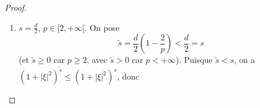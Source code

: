 \documentclass[]{report}
\begin{document}
\begin{proof}
\begin{enumerate}
            Donc
            \[\norme{u_-}_{L^\infty}\le C\norme{u}_{H^s(\R^d)}A^{\frac{d}{2}-s}\]
            où la constante $C$ est indépendante de $A$ et de $u$. On choisit $A=A(\lambda)$ tel que
            \[C\norme{u}_{H^s(\R^d)}A(\lambda)^{\frac{d}{2}-s}=\frac{\lambda}{2}\quad\text{i.e.}\quad A(\lambda)=\left(\frac{\lambda}{2C\norme{u}_{H^s(\R^d)}}\right)^{\!\frac{1}{\frac{d}{2}-s}}\]
            Alors $\norme{u_-}_{L^\infty}\le\frac{\lambda}{2}$, donc $\left\{|u_-|>\frac{\lambda}{2}\right\}=\emptyset$ et $\left|\left\{|u_-|>\frac{\lambda}{2}\right\}\right|=0$.\\
            Reste à majorer $\left|\left\{|u_+|>\frac{\lambda}{2}\right\}\right|$. Par l'inégalité de Markov:
            \[\left|\left\{|u_+|>\frac{\lambda}{2}\right\}\right|\le\frac{4}{\lambda^2}\norme{u_+}_{L^2}^2=\frac{4}{\lambda^2}\int_{|\xi|>A(\lambda)}|\hat{u}(\xi)|^2\, d\xi\]
            Par le lemme de layer-cake et en échangeant les intégrales (Fubini, les intégrandes étant positifs):
            \begin{align*}
                \norme{u}_{L^{p^*}}^{p^*}&=\int_{0}^{+\infty}p^*\lambda^{p^*-1}|\{|u|>\lambda\}|\, d\lambda\\
                &\le \int_{0}^{+\infty}4p^*\lambda^{p^*-3}\left(\int_{|\xi|>A(\lambda)}|\hat{u}(\xi)|^2\, d\xi\right)d\lambda\\
                &=\int_{\R^d}4p^*|\hat{u}(\xi)|^2\left(\int_{0}^{C|\xi|^{\frac{d}{2}-s}\norme{u}_{H^s}}\lambda^{p^*-3}\, d\lambda\right)d\xi\\
                &=\int_{\R^d}\frac{4p^*}{p^*-2}|\hat{u}(\xi)|^2\left(C|\xi|^{\frac{d}{2}-s}\norme{u}_{H^s}\right)^{p^*-2}d\xi\\
                &=C\norme{u}_{H^s}^{p^*-2}\int_{\R^d}|\xi|^{\frac{d}{p^*}(p^*-2)}|\hat{u}(\xi)|^2\, d\xi
            \end{align*}
            Or $\dfrac{d}{p^*}(p^*-2)=d\!\left(1-\dfrac{2}{p^*}\right)=d\!\left(1-\dfrac{d-2s}{d}\right)=2s$.
            Donc:
            \[\norme{u}_{L^{p^*}}^{p^*}\le C\norme{u}_{H^s}^{p^*-2}\int_{\R^d}|\xi|^{2s}|\hat{u}(\xi)|^2\, d\xi\le C\norme{u}_{H^s}^{p^*-2}\cdot N_s(u)^2\le C\norme{u}_{H^s}^{p^*}\]
            Ainsi $\norme{u}_{L^{p^*}}\le C\norme{u}_{H^s(\R^d)}$.
            \item $s=\frac{d}{2}$, $p\in[2,+\infty[$. On pose
            \[\tilde{s}=\frac{d}{2}\!\left(1-\frac{2}{p}\right)<\frac{d}{2}=s\]
            (et $\tilde{s}\ge 0$ car $p\ge 2$, avec $\tilde{s}>0$ car $p<+\infty$). Puisque $\tilde{s}<s$, on a $(1+|\xi|^2)^{\tilde{s}}\le (1+|\xi|^2)^s$, donc

\end{enumerate}
\end{proof}
\end{document}
